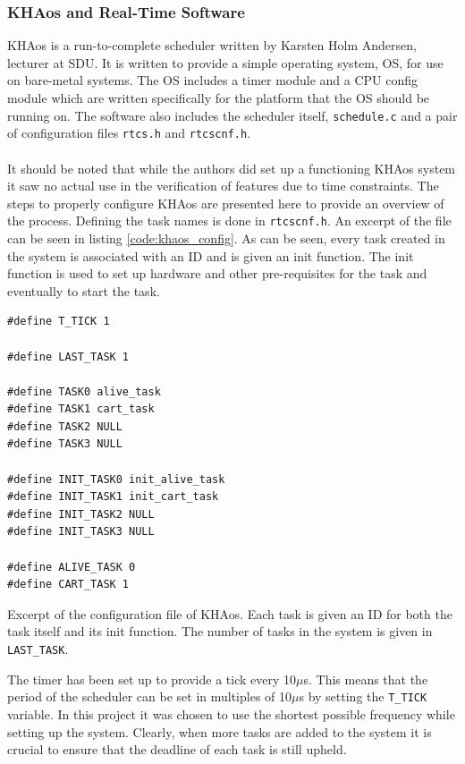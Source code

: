 \subsubsection{KHAos and Real-Time Software} %
\label{ssub:khaos}
KHAos is a run-to-complete scheduler written by Karsten Holm Andersen, lecturer at SDU.
It is written to provide a simple operating system, OS, for use on bare-metal systems.
The OS includes a timer module and a CPU config module which are written specifically for the platform that the OS should be running on.
The software also includes the scheduler itself, \texttt{schedule.c} and a pair of configuration files \texttt{rtcs.h} and \texttt{rtcscnf.h}.
\\~\\
It should be noted that while the authors did set up a functioning KHAos system it saw no actual use in the verification of features due to time constraints.
The steps to properly configure KHAos are presented here to provide an overview of the process.
Defining the task names is done in \texttt{rtcscnf.h}.
An excerpt of the file can be seen in listing \ref{code:khaos_config}.
As can be seen, every task created in the system is associated with an ID and is given an init function.
The init function is used to set up hardware and other pre-requisites for the task and eventually to start the task. 
\begin{listing}[H]
\begin{verbatim}
#define T_TICK 1

#define LAST_TASK 1

#define TASK0 alive_task
#define TASK1 cart_task
#define TASK2 NULL
#define TASK3 NULL

#define INIT_TASK0 init_alive_task
#define INIT_TASK1 init_cart_task
#define INIT_TASK2 NULL
#define INIT_TASK3 NULL

#define ALIVE_TASK 0
#define CART_TASK 1
\end{verbatim}
\caption[Configuration file of KHAos.]{Excerpt of the configuration file of KHAos. Each task is given an ID for both the task itself and its init function. The number of tasks in the system is given in \texttt{LAST\_TASK}.}
\label{code:khaos_config}
\end{listing}
The timer has been set up to provide a tick every 10$\mu$s.
This means that the period of the scheduler can be set in multiples of 10$\mu$s by setting the \texttt{T\_TICK} variable.
In this project it was chosen to use the shortest possible frequency while setting up the system.
Clearly, when more tasks are added to the system it is crucial to ensure that the deadline of each task is still upheld.
